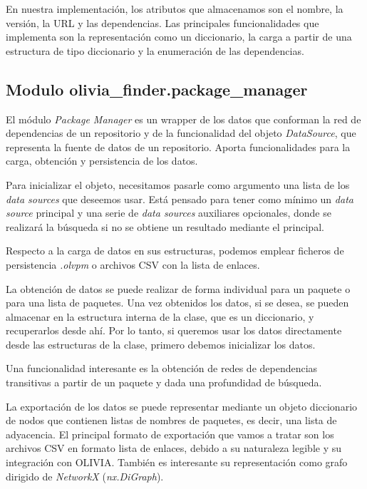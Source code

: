 En nuestra implementación, los atributos que almacenamos son el nombre, la versión, la URL y las 
dependencias. Las principales funcionalidades que implementa son la representación como un 
diccionario, la carga a partir de una estructura de tipo diccionario y la enumeración de las 
dependencias.


\subsection{Modulo olivia\_finder.package\_manager}

El módulo \textit{Package Manager} es un wrapper de los datos que conforman la red de dependencias de
 un repositorio y de la funcionalidad del objeto \textit{DataSource}, que representa la fuente de 
 datos de un repositorio. Aporta funcionalidades para la carga, obtención y persistencia de los datos.

Para inicializar el objeto, necesitamos pasarle como argumento una lista de los \textit{data sources} 
que deseemos usar. Está pensado para tener como mínimo un \textit{data source} principal y una serie 
de \textit{data sources} auxiliares opcionales, donde se realizará la búsqueda si no se obtiene un 
resultado mediante el principal.

Respecto a la carga de datos en sus estructuras, podemos emplear ficheros de 
persistencia \textit{.olvpm} o archivos CSV con la lista de enlaces.

La obtención de datos se puede realizar de forma individual para un paquete o para una lista de 
paquetes. Una vez obtenidos los datos, si se desea, se pueden almacenar en la estructura interna 
de la clase, que es un diccionario, y recuperarlos desde ahí. Por lo tanto, si queremos usar los 
datos directamente desde las estructuras de la clase, primero debemos inicializar los datos.

Una funcionalidad interesante es la obtención de redes de dependencias transitivas a partir de un 
paquete y dada una profundidad de búsqueda.

La exportación de los datos se puede representar mediante un objeto diccionario de nodos que 
contienen listas de nombres de paquetes, es decir, una lista de adyacencia. El principal formato 
de exportación que vamos a tratar son los archivos CSV en formato lista de enlaces, debido a su 
naturaleza legible y su integración con OLIVIA. También es interesante su representación como 
grafo dirigido de \textit{NetworkX} (\textit{nx.DiGraph}).

